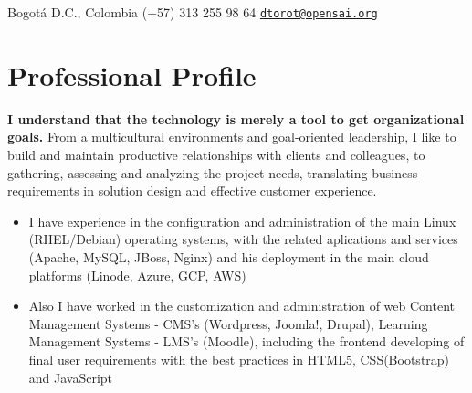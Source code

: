 \documentclass[overlapped,line,final]{../../templates/MichaelDeCorteCV/lib/res}
\begin{document}

\begin{resume}


	\begin{minipage}{0.5\linewidth}
    		Bogotá D.C., Colombia \newline
    		(+57) 313 255 98 64 \newline
		{\tt \href{mailto:dtorot@opensai.org}{dtorot@opensai.org}}
	\end{minipage}


\vspace{0.5cm}
\section{\sc Professional Profile}
\vspace{0.5cm}

	\textbf {I understand that the technology is merely a tool to get organizational goals.} From a multicultural environments and goal-oriented leadership, I like to build and maintain productive relationships with clients and colleagues, to gathering, assessing and analyzing the project needs, translating business requirements in solution design and effective customer experience.

\vspace{2mm}
\begin{itemize}
	\item I have experience in the configuration and administration of the main Linux (RHEL/Debian) operating systems, with the related aplications and services (Apache, MySQL, JBoss, Nginx) and his deployment in the main cloud platforms (Linode, Azure, GCP, AWS)
    \item Also I have worked in the customization and administration of web Content Management Systems - CMS's (Wordpress, Joomla!, Drupal), Learning Management Systems - LMS's (Moodle), including the frontend developing of final user requirements with the best practices in HTML5, CSS(Bootstrap) and JavaScript
\end{itemize}
    


\end{resume}
\end{document}
